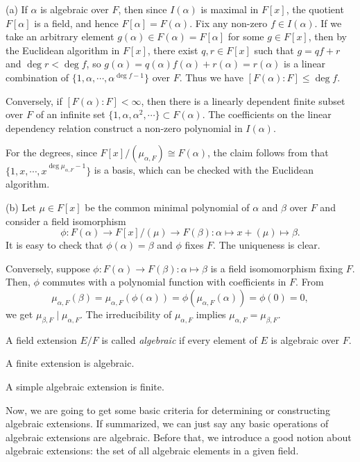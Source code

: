 \documentclass{../../large}
\begin{document}
\begin{pf}
(a)
If $\alpha$ is algebraic over $F$, then since $I(\alpha)$ is maximal in $F[x]$, the quotient $F[\alpha]$ is a field, and hence $F[\alpha]=F(\alpha)$.
Fix any non-zero $f\in I(\alpha)$.
If we take an arbitrary element $g(\alpha)\in F(\alpha)=F[\alpha]$ for some $g\in F[x]$, then by the Euclidean algorithm in $F[x]$, there exist $q,r\in F[x]$ such that $g=qf+r$ and $\deg r<\deg f$, so $g(\alpha)=q(\alpha)f(\alpha)+r(\alpha)=r(\alpha)$ is a linear combination of $\{1,\alpha,\cdots,\alpha^{\deg f-1}\}$ over $F$.
Thus we have $[F(\alpha):F]\le\deg f$.

Conversely, if $[F(\alpha):F]<\infty$, then there is a linearly dependent finite subset over $F$ of an infinite set $\{1,\alpha,\alpha^2,\cdots\}\subset F(\alpha)$.
The coefficients on the linear dependency relation construct a non-zero polynomial in $I(\alpha)$.

For the degrees, since $F[x]/(\mu_{\alpha,F})\cong F(\alpha)$, the claim follows from that $\{1,x,\cdots,x^{\deg\mu_{\alpha,F}-1}\}$ is a basis, which can be checked with the Euclidean algorithm.

(b)
Let $\mu\in F[x]$ be the common minimal polynomial of $\alpha$ and $\beta$ over $F$ and consider a field isomorphism
\[\phi:F(\alpha)\to F[x]/(\mu)\to F(\beta):\alpha\mapsto x+(\mu)\mapsto\beta.\]
It is easy to check that $\phi(\alpha)=\beta$ and $\phi$ fixes $F$.
The uniqueness is clear.

Conversely, suppose $\phi:F(\alpha)\to F(\beta):\alpha\mapsto\beta$ is a field isomomorphism fixing $F$.
Then, $\phi$ commutes with a polynomial function with coefficients in $F$.
From
\[\mu_{\alpha,F}(\beta)=\mu_{\alpha,F}(\phi(\alpha))=\phi(\mu_{\alpha,F}(\alpha))=\phi(0)=0,\]
we get $\mu_{\beta,F}\mid\mu_{\alpha,F}$.
The irreducibility of $\mu_{\alpha,F}$ implies $\mu_{\alpha,F}=\mu_{\beta,F}$.
\end{pf}

\begin{prb}
A field extension $E/F$ is called \emph{algebraic} if every element of $E$ is algebraic over $F$.
\begin{parts}
\item A finite extension is algebraic.
\item A simple algebraic extension is finite.
\end{parts}
\end{prb}

Now, we are going to get some basic criteria for determining or constructing algebraic extensions.
If summarized, we can just say any basic operations of algebraic extensions are algebraic.
Before that, we introduce a good notion about algebraic extensions: the set of all algebraic elements in a given field.
\end{document}
